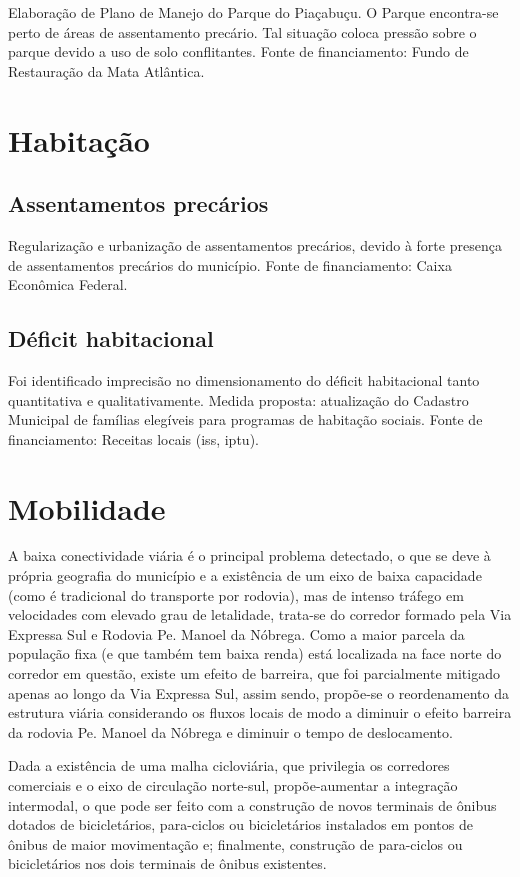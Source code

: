 	Elaboração de Plano de Manejo do Parque do Piaçabuçu. O Parque encontra-se perto de áreas de assentamento precário.  Tal situação coloca pressão sobre o parque devido a uso de solo conflitantes. Fonte de financiamento: Fundo de Restauração da Mata Atlântica.
	
	\section{Habitação}
	
	\subsection{Assentamentos precários}
	
	Regularização e urbanização de assentamentos precários, devido à forte presença de assentamentos precários do município. Fonte de financiamento: Caixa Econômica Federal.

	\subsection{Déficit habitacional}
   
   Foi identificado imprecisão no dimensionamento do déficit habitacional tanto quantitativa e qualitativamente. Medida proposta: atualização do Cadastro Municipal de famílias elegíveis para programas de habitação sociais.
   Fonte de financiamento: Receitas locais (\gls{iss}, \gls{iptu}).
   
	\section{Mobilidade}
	
	A baixa conectividade viária é o principal problema detectado, o que se deve à própria geografia do município e a existência de um eixo de baixa capacidade (como é tradicional do transporte por rodovia), mas de intenso tráfego em velocidades com elevado grau de letalidade, trata-se do corredor formado pela Via Expressa Sul e Rodovia Pe. Manoel da Nóbrega. Como a maior parcela da população fixa (e que também tem baixa renda) está localizada na face norte do corredor em questão, existe um efeito de barreira, que foi parcialmente mitigado apenas ao longo da Via Expressa Sul, assim sendo, propõe-se o reordenamento da estrutura viária considerando os fluxos locais de modo a diminuir o efeito barreira da rodovia Pe. Manoel da Nóbrega e diminuir o tempo de deslocamento.
	
	Dada a existência de uma malha cicloviária, que privilegia os corredores comerciais e o eixo de circulação norte-sul, propõe-aumentar a integração intermodal, o que pode ser feito com a construção de novos terminais de ônibus dotados de bicicletários, para-ciclos ou bicicletários instalados em pontos de ônibus de maior movimentação e; finalmente, construção de para-ciclos ou bicicletários nos dois terminais de ônibus existentes.
	
